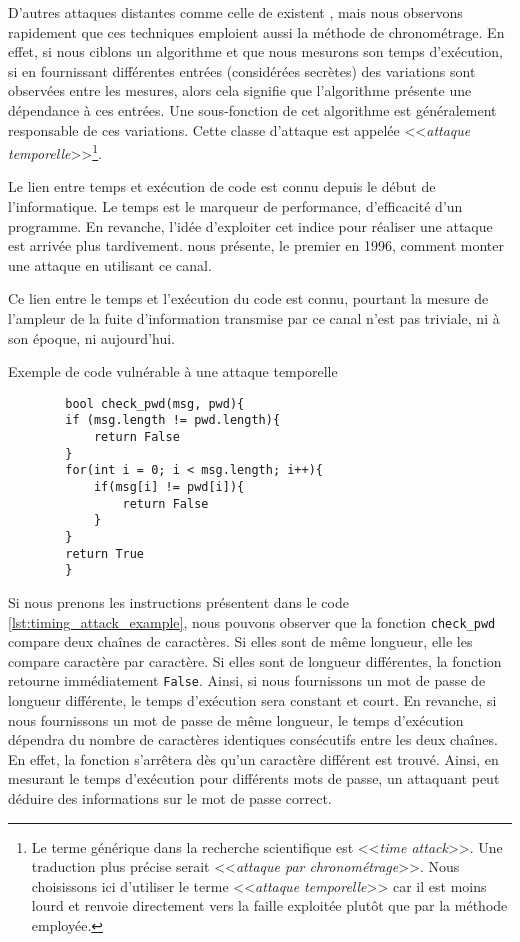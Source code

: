 D'autres attaques distantes comme celle de \citeauthor{LLC_attack} existent \cite{cryptoeprint:2016/224,Moghimi_2017,vanbulck2018nemesis}, mais nous observons rapidement que ces techniques emploient aussi la méthode de chronométrage. En effet, si nous ciblons un algorithme et que nous mesurons son temps d'exécution, si en fournissant différentes entrées (considérées secrètes) des variations sont observées entre les mesures, alors cela signifie que l'algorithme présente une dépendance à ces entrées. Une sous-fonction de cet algorithme est généralement responsable de ces variations. Cette classe d'attaque est appelée <<\textit{attaque temporelle}>>\footnote{Le terme générique dans la recherche scientifique est <<\textit{time attack}>>. Une traduction plus précise serait <<\textit{attaque par chronométrage}>>. Nous choisissons ici d'utiliser le terme <<\textit{attaque temporelle}>> car il est moins lourd et renvoie directement vers la faille exploitée plutôt que par la méthode employée.}.\medbreak

Le lien entre temps et exécution de code est connu depuis le début de l'informatique. Le temps est le marqueur de performance, d'efficacité d'un programme. En revanche, l'idée d'exploiter cet indice pour réaliser une attaque est arrivée plus tardivement. \citeauthor{crypto-1996-1469} nous présente, le premier en 1996, comment monter une attaque en utilisant ce canal.\medbreak

Ce lien entre le temps et l'exécution du code est connu, pourtant la mesure de l'ampleur de la fuite d'information transmise par ce canal n'est pas triviale, ni à son époque, ni aujourd'hui.

\begin{listing}[!ht]
    \caption{Exemple de code vulnérable à une attaque temporelle}
    \label{lst:timing_attack_example}
    \begin{verbatim}
        bool check_pwd(msg, pwd){
        if (msg.length != pwd.length){
            return False
        }
        for(int i = 0; i < msg.length; i++){
            if(msg[i] != pwd[i]){
                return False
            }
        }
        return True
        }
    \end{verbatim}
\end{listing}
                
Si nous prenons les instructions présentent dans le code \ref{lst:timing_attack_example}, nous pouvons observer que la fonction \texttt{check\_pwd} compare deux chaînes de caractères. Si elles sont de même longueur, elle les compare caractère par caractère. Si elles sont de longueur différentes, la fonction retourne immédiatement \texttt{False}. Ainsi, si nous fournissons un mot de passe de longueur différente, le temps d'exécution sera constant et court. En revanche, si nous fournissons un mot de passe de même longueur, le temps d'exécution dépendra du nombre de caractères identiques consécutifs entre les deux chaînes. En effet, la fonction s'arrêtera dès qu'un caractère différent est trouvé. Ainsi, en mesurant le temps d'exécution pour différents mots de passe, un attaquant peut déduire des informations sur le mot de passe correct.\medbreak

